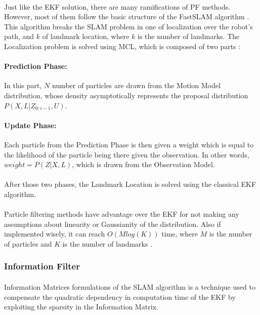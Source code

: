 \documentclass[12pt]{article}
\begin{document}
	\paragraph{}
	Just like the EKF solution, there are many ramifications of PF methods. However, most of them follow the basic structure of the FastSLAM algorithm \cite{Montemerlo02fastslam:a}. This algorithm breaks the SLAM problem in one of localization over the robot's path, and $k$ of landmark location, where $k$ is the number of landmarks. The Localization problem is solved using MCL, which is composed of two parts \cite{772544}:
	 
	 \paragraph{Prediction Phase:} In this part, $N$ number of particles are drawn from the Motion Model distribution, whose density asymptotically represents the proposal distribution $P(X, L | Z_{0:i-1}, U)$.
	 
	 \paragraph{Update Phase:} Each particle from the Prediction Phase is then given a weight which is equal to the likelihood of the particle being there given the observation. In other words, $weight = P(Z|X, L)$, which is drawn from the Observation Model.
	 
	 \paragraph{}
	 After those two phases, the Landmark Location is solved using the classical EKF algorithm.
	 
	 \paragraph{}
	 Particle filtering methods have advantage over the EKF for not making any assumptions about linearity or Gaussianity of the distribution. Also if implemented wisely, it can reach $O(Mlog(K))$ time, where $M$ is the number of particles and $K$ is the number of landmarks \cite{Montemerlo02fastslam:a}.
	 
	 
	
	\subsubsection{Information Filter}
	\paragraph{}
	Information Matrices formulations of the SLAM algorithm is a technique used to compensate the quadratic dependency in computation time of the EKF by exploiting the sparsity in the Information Matrix.
\end{document}
